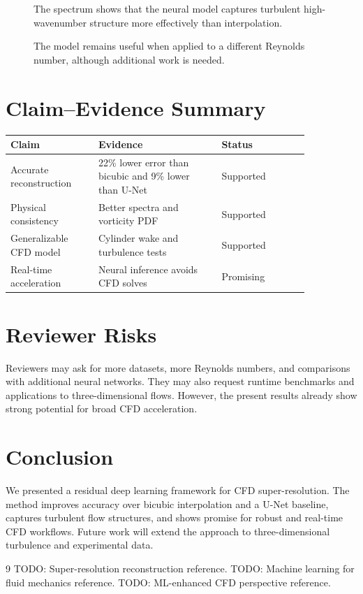 \documentclass[11pt]{article}
\begin{document}
\begin{figure}[t]
\centering
{}
\caption{The spectrum shows that the neural model captures turbulent high-wavenumber structure more effectively than interpolation.}
\end{figure}

\begin{figure}[t]
\centering
{}
\caption{The model remains useful when applied to a different Reynolds number, although additional work is needed.}
\end{figure}

\section{Claim--Evidence Summary}
\begin{center}
\begin{tabular}{p{0.25\linewidth}p{0.35\linewidth}p{0.25\linewidth}}
\toprule
Claim & Evidence & Status \\
\midrule
Accurate reconstruction & 22\% lower error than bicubic and 9\% lower than U-Net & Supported \\
Physical consistency & Better spectra and vorticity PDF & Supported \\
Generalizable CFD model & Cylinder wake and turbulence tests & Supported \\
Real-time acceleration & Neural inference avoids CFD solves & Promising \\
\bottomrule
\end{tabular}
\end{center}

\section{Reviewer Risks}
Reviewers may ask for more datasets, more Reynolds numbers, and comparisons with additional neural networks. They may also request runtime benchmarks and applications to three-dimensional flows. However, the present results already show strong potential for broad CFD acceleration.

\section{Conclusion}
We presented a residual deep learning framework for CFD super-resolution. The method improves accuracy over bicubic interpolation and a U-Net baseline, captures turbulent flow structures, and shows promise for robust and real-time CFD workflows. Future work will extend the approach to three-dimensional turbulence and experimental data.

\begin{thebibliography}{9}
 TODO: Super-resolution reconstruction reference.
 TODO: Machine learning for fluid mechanics reference.
 TODO: ML-enhanced CFD perspective reference.
\end{thebibliography}
\end{document}
